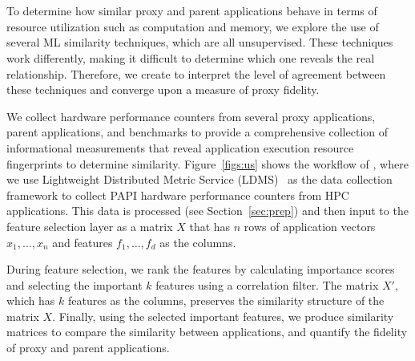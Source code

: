 \section{\us}
\label{sec:simEngine}
To determine how similar proxy and parent applications behave in terms of resource utilization such as computation and memory, we explore the use of several ML similarity techniques, which are all unsupervised. These techniques work differently, making it difficult to determine which one reveals the real relationship. Therefore, we create \us to interpret the level of agreement between these techniques and converge upon a measure of proxy fidelity. 

We collect hardware performance counters from several proxy applications, parent applications, and benchmarks to provide a comprehensive collection of informational measurements that reveal application execution resource fingerprints to determine similarity.  
Figure~\ref{figs:us} shows the workflow of \us, where we use Lightweight Distributed Metric Service (LDMS)~\cite{ldms_sandia} as the data collection framework to collect PAPI hardware performance counters from HPC applications. This data is processed (see Section~\ref{sec:prep}) and then input to the feature selection layer as a matrix $X$ that has $n$ rows of application vectors $x_{1},\ldots,x_{n}$ and features $f_{1},\ldots,f_{d}$ as the columns.


During feature selection, we rank the features by calculating importance scores and selecting the important $k$ features using a correlation filter.
The matrix $X'$, which has $k$ features as the columns, preserves the similarity structure of the matrix $X$. 
Finally, using the selected important features, we produce similarity matrices to compare the similarity between applications, and quantify the fidelity of proxy and parent applications. 

